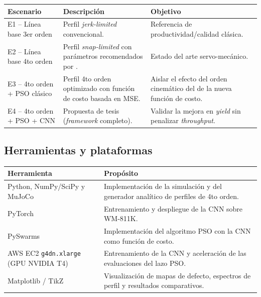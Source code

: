 \documentclass[11pt]{article}
\begin{document}
\begin{table}[H]
\centering
\small
\setlength{\tabcolsep}{6pt}
\renewcommand{\arraystretch}{1.35}
\begin{tabular}{L{3cm} L{6cm} L{5cm}}
\toprule
\textbf{Escenario} & \textbf{Descripción} & \textbf{Objetivo} \\
\midrule
E1 -- Línea base 3er orden & Perfil \textit{jerk-limited} convencional. & Referencia de productividad/calidad clásica. \\
E2 -- Línea base 4to orden & Perfil \textit{snap-limited} con parámetros recomendados por \cite{Al-Rawashdeh2023a}. & Estado del arte servo-mecánico. \\
E3 -- 4to orden + PSO clásico & Perfil 4to orden optimizado con función de costo basada en MSE. & Aislar el efecto del orden cinemático del de la nueva función de costo. \\
E4 -- 4to orden + PSO + CNN & Propuesta de tesis (\textit{framework} completo). & Validar la mejora en \textit{yield} sin penalizar \textit{throughput}. \\
\bottomrule
\end{tabular}
\end{table}

\subsection*{Herramientas y plataformas}

\begin{table}[H]
\centering
\small
\setlength{\tabcolsep}{6pt}
\renewcommand{\arraystretch}{1.35}
\begin{tabular}{L{4.5cm} L{9.5cm}}
\toprule
\textbf{Herramienta} & \textbf{Propósito} \\
\midrule
Python, NumPy/SciPy y MuJoCo & Implementación de la simulación y del generador analítico de perfiles de 4to orden. \\
PyTorch & Entrenamiento y despliegue de la CNN sobre WM-811K. \\
PySwarms & Implementación del algoritmo PSO con la CNN como función de costo. \\
AWS EC2 \texttt{g4dn.xlarge} (GPU NVIDIA T4) & Entrenamiento de la CNN y aceleración de las evaluaciones del lazo PSO. \\
Matplotlib / TikZ & Visualización de mapas de defecto, espectros de perfil y resultados comparativos. \\
\bottomrule
\end{tabular}
\end{table}
\end{document}
